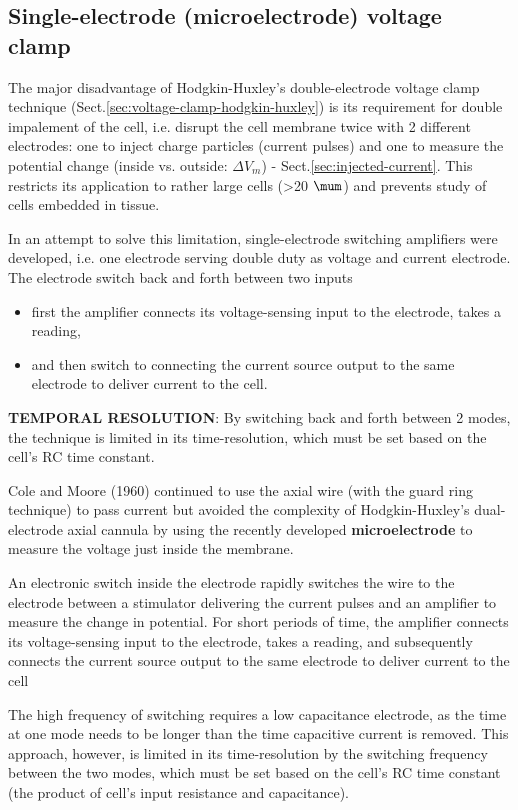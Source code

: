 \subsection{Single-electrode (microelectrode) voltage clamp}
\label{sec:voltage-clamp-single-electrode}

The major disadvantage of Hodgkin-Huxley's double-electrode voltage clamp
technique (Sect.\ref{sec:voltage-clamp-hodgkin-huxley}) is its requirement for
double impalement of the cell, i.e. disrupt the cell membrane twice with 2
different electrodes: one to inject charge particles (current pulses) and one to
measure the potential change (inside vs. outside: $\Delta V_m$) -
Sect.\ref{sec:injected-current}. This restricts its application to rather large
cells (>20 $\mum$) and prevents study of cells embedded in tissue.

In an attempt to solve this limitation, single-electrode switching amplifiers
were developed, i.e. one electrode serving double duty as voltage and current
electrode. The electrode switch back and forth between two inputs
\begin{itemize}
  \item  first the amplifier connects its voltage-sensing input
to the electrode, takes a reading, 

  \item and then switch to connecting the current source output to the same
  electrode to deliver current to the cell.
\end{itemize}

{\bf TEMPORAL RESOLUTION}: By switching back and forth between 2 modes, the
technique is limited in its time-resolution, which must be set based on the
cell's RC time constant. 

Cole and Moore (1960) continued to use the axial wire (with the guard ring
technique) to pass current but avoided the complexity of Hodgkin-Huxley's
dual-electrode axial cannula by using the recently developed {\bf
microelectrode} to measure the voltage just inside the membrane.

An electronic switch inside the electrode rapidly switches the wire to the
electrode between a stimulator delivering the current pulses and an amplifier to
measure the change in potential. For short periods of time, the amplifier
connects its voltage-sensing input to the electrode, takes a reading, and
subsequently connects the current source output to the same electrode to deliver
current to the cell

The high frequency of switching requires a low capacitance electrode, as the
time at one mode needs to be longer than the time capacitive current is removed.
This approach, however, is limited in its time-resolution by the switching
frequency between the two modes, which must be set based on the cell's RC time
constant (the product of cell's input resistance and capacitance).


